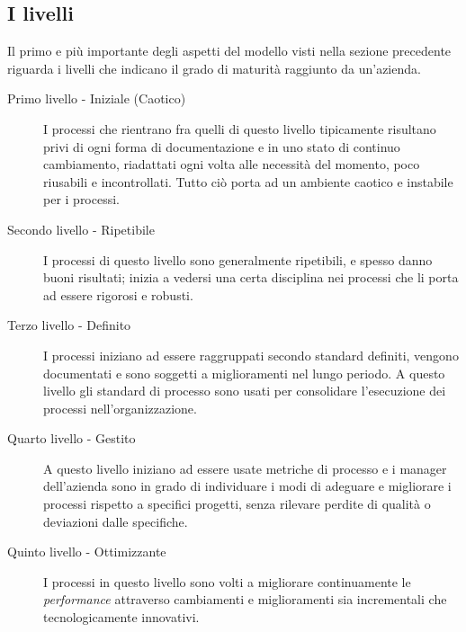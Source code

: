 	\subsection{I livelli}
		Il primo e più importante degli aspetti del modello visti nella sezione precedente riguarda i livelli che indicano il grado di maturità raggiunto da un'azienda.
		\begin{description}
			\item[Primo livello - Iniziale (Caotico)] I processi che rientrano fra quelli di questo livello tipicamente risultano privi di ogni forma di documentazione e in uno stato di continuo cambiamento, riadattati ogni volta alle necessità del momento, poco riusabili e incontrollati. Tutto ciò porta ad un ambiente caotico e instabile per i processi.
			\item[Secondo livello - Ripetibile] I processi di questo livello sono generalmente ripetibili, e spesso danno buoni risultati; inizia a vedersi una certa disciplina nei processi che li porta ad essere rigorosi e robusti.
			\item[Terzo  livello - Definito] I processi iniziano ad essere raggruppati secondo standard definiti, vengono documentati e sono soggetti a miglioramenti nel lungo periodo. A questo livello gli standard di processo sono usati per consolidare l'esecuzione dei processi nell'organizzazione.
			\item[Quarto livello - Gestito] A questo livello iniziano ad essere usate metriche di processo e i manager dell'azienda sono in grado di individuare i modi di adeguare e migliorare i processi rispetto a specifici progetti, senza rilevare perdite di qualità o deviazioni dalle specifiche.
			\item[Quinto livello - Ottimizzante] I processi in questo livello sono volti a migliorare continuamente le \textit{performance} attraverso cambiamenti e miglioramenti sia incrementali che tecnologicamente innovativi.
		\end{description}

